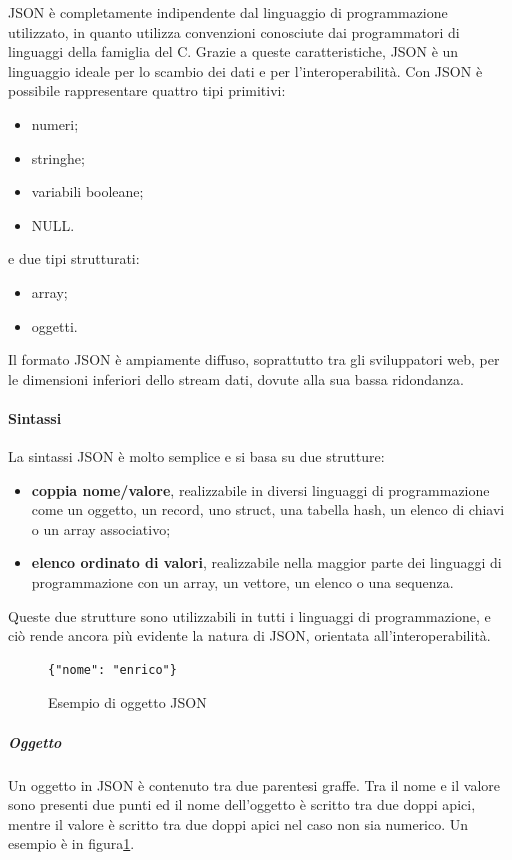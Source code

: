 JSON è completamente indipendente dal linguaggio di programmazione utilizzato, in quanto utilizza convenzioni conosciute dai programmatori di linguaggi della famiglia del C. 
Grazie a queste caratteristiche, JSON è un linguaggio ideale per lo scambio dei dati e per l'interoperabilità.
Con JSON è possibile rappresentare quattro tipi primitivi:
\begin{itemize}
\item numeri;
\item stringhe;
\item variabili booleane;
\item NULL.
\end{itemize}
e due tipi strutturati:
\begin{itemize}
\item array;
\item oggetti.
\end{itemize}

Il formato JSON è ampiamente diffuso, soprattutto tra gli sviluppatori web, per le dimensioni inferiori dello stream dati, dovute alla sua bassa ridondanza.

\paragraph{Sintassi}
La sintassi JSON è molto semplice e si basa su due strutture:
\begin{itemize}
\item \textbf{coppia nome/valore}, realizzabile in diversi linguaggi di programmazione come un oggetto, un record, uno struct, una tabella hash, un elenco di chiavi o un array associativo;
\item \textbf{elenco ordinato di valori}, realizzabile nella maggior parte dei linguaggi di programmazione con un array, un vettore, un elenco o una sequenza.
\end{itemize}
Queste due strutture sono utilizzabili in tutti i linguaggi di programmazione, e ciò rende ancora più evidente la natura di JSON, orientata all'interoperabilità.

\begin{figure}
\lstset{language=JSON}
\begin{lstlisting}
{"nome": "enrico"}
\end{lstlisting}
\caption{Esempio di oggetto JSON\label{jsonobjectimage}}
\end{figure}
\subparagraph{Oggetto}
Un oggetto in JSON è contenuto tra due parentesi graffe. Tra il nome e il valore sono presenti due punti ed il nome dell'oggetto è scritto tra due doppi apici, mentre il valore è scritto tra due doppi apici nel caso non sia numerico. Un esempio è in figura\ref{jsonobjectimage}.

